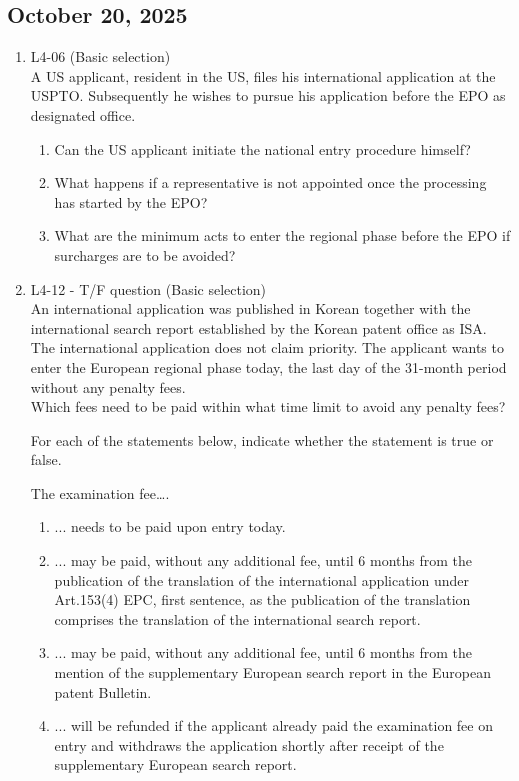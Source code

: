 \documentclass{report}
\begin{document}
\begin{enumerate}[label=\textbf{Question \arabic*}]
    \section{October 20, 2025}

\begin{enumerate}[label=\textbf{Question \arabic*}]

    \item %
    L4-06 (Basic selection) \\
    A US applicant, resident in the US, files his international application at the USPTO. Subsequently he wishes to pursue his application before the EPO as designated office.
    \begin{enumerate}[label=(\alph*)]
        \item Can the US applicant initiate the national entry procedure himself?
        \item What happens if a representative is not appointed once the processing has started by the EPO?
        \item What are the minimum acts to enter the regional phase before the EPO if surcharges are to be avoided?
    \end{enumerate}

    \item %
    L4-12 - T/F question (Basic selection) \\
    An international application was published in Korean together with the international search report established by the Korean patent office as ISA. The international application does not claim priority. The applicant wants to enter the European regional phase today, the last day of the 31-month period without any penalty fees. \\
    Which fees need to be paid within what time limit to avoid any penalty fees?

    \vspace{1em}
    For each of the statements below, indicate whether the statement is true or false.
    
    \vspace{0.5em}
    The examination fee….
    \begin{enumerate}[label=(\alph*)]
        \item ... needs to be paid upon entry today.
        \item ... may be paid, without any additional fee, until 6 months from the publication of the translation of the international application under Art.153(4) EPC, first sentence, as the publication of the translation comprises the translation of the international search report.
        \item ... may be paid, without any additional fee, until 6 months from the mention of the supplementary European search report in the European patent Bulletin.
        \item ... will be refunded if the applicant already paid the examination fee on entry and withdraws the application shortly after receipt of the supplementary European search report.
    \end{enumerate}


\end{enumerate}
\end{enumerate}
\end{document}
